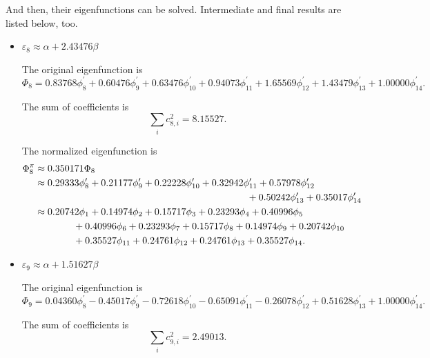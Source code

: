		And then, their eigenfunctions can be solved. Intermediate and final results are listed below, too.
		\begin{itemize}
		
		\item $\varepsilon_8 \approx \alpha + 2.43476 \beta$
		
		The original eigenfunction is
		\begin{equation*}
			\Phi_8 = 0.83768 \phi^\prime_8 + 0.60476 \phi^\prime_9 + 0.63476 \phi^\prime_{10} + 0.94073 \phi^\prime_{11} + 1.65569 \phi^\prime_{12} + 1.43479 \phi^\prime_{13} + 1.00000 \phi^\prime_{14}.
		\end{equation*}
		
		The sum of coefficients is
		\begin{equation*}
			\sum_{i} c^2_{8,i} = 8.15527.
		\end{equation*}
		
		The normalized eigenfunction is		
		\begin{align}
			\Phi^\pi_8 &\approx 0.350171 \Phi_8 \notag \\
			&\approx 0.29333 \phi^\prime_8 + 0.21177 \phi^\prime_9 + 0.22228 \phi^\prime_{10} + 0.32942 \phi^\prime_{11} + 0.57978 \phi^\prime_{12}  \notag\\
			&\hspace*{22em} + 0.50242 \phi^\prime_{13} + 0.35017 \phi^\prime_{14} \notag \\
			&\approx 0.20742 \phi_1 + 0.14974 \phi_2 + 0.15717 \phi_3 + 0.23293 \phi_4 + 0.40996 \phi_5  \notag \\
			&\hspace*{4em} +0.40996\phi_6 +0.23293 \phi_7 + 0.15717 \phi_8 +0.14974 \phi_9  +0.20742 \phi_{10} \notag \\
			&\hspace*{4em} +0.35527 \phi_{11} + 0.24761 \phi_{12} + 0.24761 \phi_{13} + 0.35527 \phi_{14} .
		\end{align}
		
		
		\item $\varepsilon_9 \approx \alpha + 1.51627 \beta$
		
		The original eigenfunction is
		\begin{equation*}
			\Phi_9 = 0.04360 \phi^\prime_8 - 0.45017 \phi^\prime_9 -0.72618 \phi^\prime_{10} -0.65091 \phi^\prime_{11} -0.26078 \phi^\prime_{12} + 0.51628 \phi^\prime_{13} + 1.00000 \phi^\prime_{14}.
		\end{equation*}
		
		The sum of coefficients is
		\begin{equation*}
			\sum_{i} c^2_{9,i} = 2.49013.
		\end{equation*}
		

\end{itemize}
